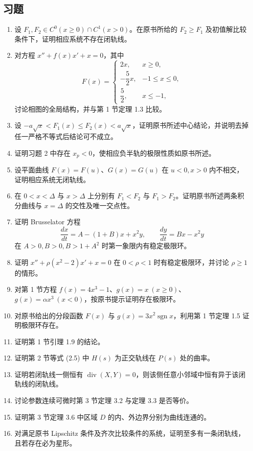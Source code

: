 \subsection*{习题}
\begin{enumerate}
\item 设 $F_1,F_2\in C^0(x\geqslant0)\cap C^1(x>0)$。在原书所给的 $F_2\geqslant F_1$ 及初值解比较条件下，证明相应系统不存在闭轨线。
\item 对方程 $x''+f(x)x'+x=0$，其中
\[
F(x)=\begin{cases}2x,&x\geqslant0,\\-\dfrac52x,&-1\leqslant x\leqslant0,\\\dfrac52,&x\leqslant-1,\end{cases}
\]
讨论相图的全局结构，并与第 1 节定理 1.3 比较。
\item 设 $-a\sqrt{x}<F_1(x)\leqslant F_2(x)<a\sqrt{x}$，证明原书所述中心结论，并说明去掉任一严格不等式后结论可不成立。
\item 证明习题 2 中存在 $x_p<0$，使相应负半轨的极限性质如原书所述。
\item 设平面曲线 $F(x)=F(u)$、$G(x)=G(u)$ 在 $u<0,x>0$ 内不相交，证明相应系统无闭轨线。
\item 在 $0<x<\Delta$ 与 $x>\Delta$ 上分别有 $F_1<F_2$ 与 $F_1>F_2$。证明原书所述两条积分曲线与 $x=\Delta$ 的交性及唯一交点性。
\item 证明 Brusselator 方程
\[
\dfrac{dx}{dt}=A-(1+B)x+x^2y,\qquad \dfrac{dy}{dt}=Bx-x^2y
\]
在 $A>0,B>0,B>1+A^2$ 时第一象限内有稳定极限环。
\item 证明 $x''+\rho(x^2-2)x'+x=0$ 在 $0<\rho<1$ 时有稳定极限环，并讨论 $\rho\geqslant1$ 的情形。
\item 对第 1 节方程 $f(x)=4x^3-1$、$g(x)=x\ (x\geqslant0)$、$g(x)=\alpha x^3\ (x<0)$，按原书提示证明存在极限环。
\item 对原书给出的分段函数 $F(x)$ 与 $g(x)=3x^2\operatorname{sgn}x$，利用第 1 节定理 1.5 证明极限环存在。
\item 证明第 1 节引理 1.9 的结论。
\item 证明第 2 节等式 (2.5) 中 $H(s)$ 为正交轨线在 $P(s)$ 处的曲率。
\item 证明若闭轨线一侧恒有 $\operatorname{div}(X,Y)=0$，则该侧任意小邻域中恒有异于该闭轨线的闭轨线。
\item 讨论参数连续可微时第 3 节定理 3.2 与定理 3.3 是否等价。
\item 证明第 3 节定理 3.6 中区域 $D$ 的内、外边界分别为曲线连通的。
\item 对满足原书 Lipschitz 条件及齐次比较条件的系统，证明至多有一条闭轨线，且若存在必为星形。

\end{enumerate}
